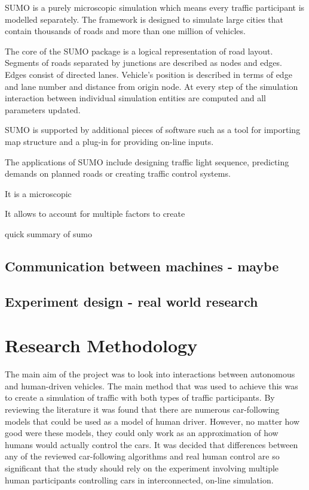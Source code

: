 \documentclass[11pt,english]{article}
\begin{document}
SUMO is a purely microscopic simulation which means every traffic participant is modelled separately. The framework is designed to simulate large cities that contain thousands of roads and more than one million of vehicles.

The core of the SUMO package is a logical representation of road layout. Segments of roads separated by junctions are described as nodes and edges. Edges consist of directed lanes. Vehicle's position is described in terms of edge and lane number and distance from origin node. At every step of the simulation interaction between individual simulation entities are computed and all parameters updated. 
\citep{krajzewicz2002sumo}

SUMO is supported by additional pieces of software such as a tool for importing map structure and a plug-in for providing on-line inputs.

The applications of SUMO include designing traffic light sequence, predicting demands on planned roads or creating traffic control systems.  


It is a microscopic

It allows to account for multiple factors to create 

quick summary of sumo
	


\subsection{Communication between machines - maybe}




\subsection{Experiment design - real world research}







\citet{parkin2016understanding}

\section{Research Methodology}

The main aim of the project was to look into interactions between autonomous and human-driven vehicles. The main method that was used to achieve this was to create a simulation of traffic with both types of traffic participants. By reviewing the literature it was found that there are numerous car-following models that could be used as a model of human driver. However, no matter how good were these models, they could only work as an approximation of how humans would actually control the cars. It was decided that differences between any of the reviewed car-following algorithms and real human control are so significant that the study should rely on the experiment involving multiple human participants controlling cars in interconnected, on-line simulation.
 
\end{document}
